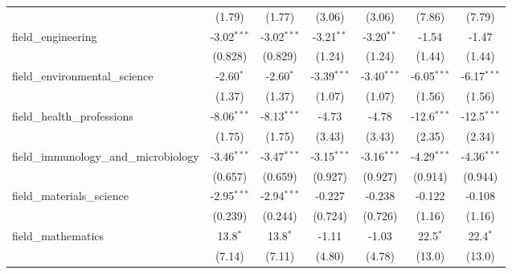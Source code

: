 \begin{tabular}{lcccccc}
                                                               & (1.79)         & (1.77)         & (3.06)        & (3.06)        & (7.86)         & (7.79)\\   
   field\_engineering                                          & -3.02$^{***}$  & -3.02$^{***}$  & -3.21$^{**}$  & -3.20$^{**}$  & -1.54          & -1.47\\   
                                                               & (0.828)        & (0.829)        & (1.24)        & (1.24)        & (1.44)         & (1.44)\\   
   field\_environmental\_science                               & -2.60$^{*}$    & -2.60$^{*}$    & -3.39$^{***}$ & -3.40$^{***}$ & -6.05$^{***}$  & -6.17$^{***}$\\   
                                                               & (1.37)         & (1.37)         & (1.07)        & (1.07)        & (1.56)         & (1.56)\\   
   field\_health\_professions                                  & -8.06$^{***}$  & -8.13$^{***}$  & -4.73         & -4.78         & -12.6$^{***}$  & -12.5$^{***}$\\   
                                                               & (1.75)         & (1.75)         & (3.43)        & (3.43)        & (2.35)         & (2.34)\\   
   field\_immunology\_and\_microbiology                        & -3.46$^{***}$  & -3.47$^{***}$  & -3.15$^{***}$ & -3.16$^{***}$ & -4.29$^{***}$  & -4.36$^{***}$\\   
                                                               & (0.657)        & (0.659)        & (0.927)       & (0.927)       & (0.914)        & (0.944)\\   
   field\_materials\_science                                   & -2.95$^{***}$  & -2.94$^{***}$  & -0.227        & -0.238        & -0.122         & -0.108\\   
                                                               & (0.239)        & (0.244)        & (0.724)       & (0.726)       & (1.16)         & (1.16)\\   
   field\_mathematics                                          & 13.8$^{*}$     & 13.8$^{*}$     & -1.11         & -1.03         & 22.5$^{*}$     & 22.4$^{*}$\\   
                                                               & (7.14)         & (7.11)         & (4.80)        & (4.78)        & (13.0)         & (13.0)\\   

\end{tabular}
